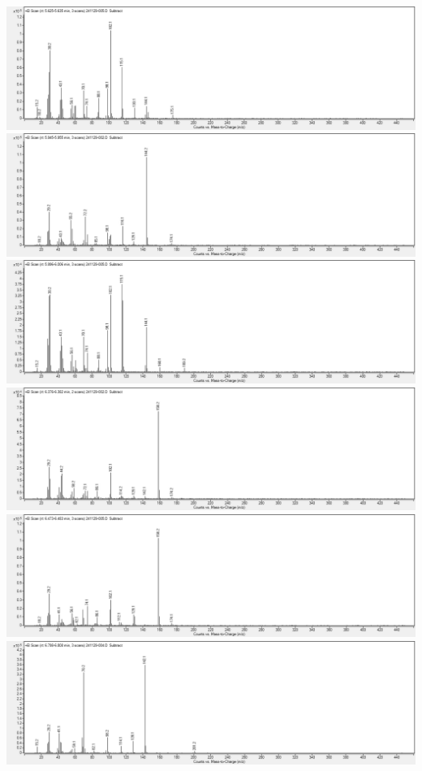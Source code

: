 \includegraphics[width=1\linewidth]{graphics/data/MS/05635.png}
\includegraphics[width=1\linewidth]{graphics/data/MS/05955.png}
\includegraphics[width=1\linewidth]{graphics/data/MS/06001.png}
\includegraphics[width=1\linewidth]{graphics/data/MS/06382.png}
\includegraphics[width=1\linewidth]{graphics/data/MS/06478.png}
\includegraphics[width=1\linewidth]{graphics/data/MS/06803.png}
